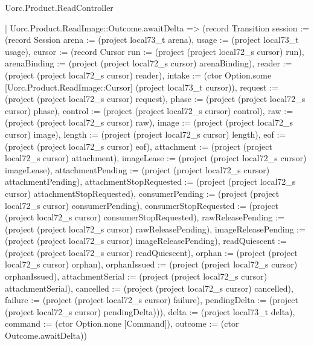 \begin{lexlean}{Uorc.Product.ReadController}
\begin{semanticmodule}
{    | Uorc.Product.ReadImage::Outcome.awaitDelta => (record Transition {session := (record Session {arena := (project local73_t arena), usage := (project local73_t usage), cursor := (record Cursor {run := (project (project local72_s cursor) run), arenaBinding := (project (project local72_s cursor) arenaBinding), reader := (project (project local72_s cursor) reader), intake := (ctor Option.some [Uorc.Product.ReadImage::Cursor] (project local73_t cursor)), request := (project (project local72_s cursor) request), phase := (project (project local72_s cursor) phase), control := (project (project local72_s cursor) control), raw := (project (project local72_s cursor) raw), image := (project (project local72_s cursor) image), length := (project (project local72_s cursor) length), eof := (project (project local72_s cursor) eof), attachment := (project (project local72_s cursor) attachment), imageLease := (project (project local72_s cursor) imageLease), attachmentPending := (project (project local72_s cursor) attachmentPending), attachmentStopRequested := (project (project local72_s cursor) attachmentStopRequested), consumerPending := (project (project local72_s cursor) consumerPending), consumerStopRequested := (project (project local72_s cursor) consumerStopRequested), rawReleasePending := (project (project local72_s cursor) rawReleasePending), imageReleasePending := (project (project local72_s cursor) imageReleasePending), readQuiescent := (project (project local72_s cursor) readQuiescent), orphan := (project (project local72_s cursor) orphan), orphanIssued := (project (project local72_s cursor) orphanIssued), attachmentSerial := (project (project local72_s cursor) attachmentSerial), cancelled := (project (project local72_s cursor) cancelled), failure := (project (project local72_s cursor) failure), pendingDelta := (project (project local72_s cursor) pendingDelta)})}), delta := (project local73_t delta), command := (ctor Option.none [Command]), outcome := (ctor Outcome.awaitDelta)})
}
\end{semanticmodule}
\end{lexlean}
